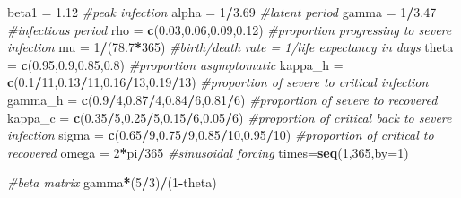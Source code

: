 \documentclass[
]{article}
\newenvironment{Shaded}{\begin{snugshade}}{\end{snugshade}}
\newcommand{\CommentTok}[1]{\textcolor[rgb]{0.56,0.35,0.01}{\textit{#1}}}
\newcommand{\DataTypeTok}[1]{\textcolor[rgb]{0.13,0.29,0.53}{#1}}
\newcommand{\DecValTok}[1]{\textcolor[rgb]{0.00,0.00,0.81}{#1}}
\newcommand{\FloatTok}[1]{\textcolor[rgb]{0.00,0.00,0.81}{#1}}
\newcommand{\KeywordTok}[1]{\textcolor[rgb]{0.13,0.29,0.53}{\textbf{#1}}}
\newcommand{\NormalTok}[1]{#1}
\newcommand{\OperatorTok}[1]{\textcolor[rgb]{0.81,0.36,0.00}{\textbf{#1}}}
\newcommand{\StringTok}[1]{\textcolor[rgb]{0.31,0.60,0.02}{#1}}
\begin{document}
\begin{Shaded}
\begin{Highlighting}[]
\NormalTok{beta1 =}\StringTok{ }\FloatTok{1.12} \CommentTok{#peak infection}
\NormalTok{alpha =}\StringTok{ }\DecValTok{1}\OperatorTok{/}\FloatTok{3.69} \CommentTok{#latent period}
\NormalTok{gamma =}\StringTok{ }\DecValTok{1}\OperatorTok{/}\FloatTok{3.47} \CommentTok{#infectious period}
\NormalTok{rho =}\StringTok{ }\KeywordTok{c}\NormalTok{(}\FloatTok{0.03}\NormalTok{,}\FloatTok{0.06}\NormalTok{,}\FloatTok{0.09}\NormalTok{,}\FloatTok{0.12}\NormalTok{) }\CommentTok{#proportion progressing to severe infection}
\NormalTok{mu =}\StringTok{ }\DecValTok{1}\OperatorTok{/}\NormalTok{(}\FloatTok{78.7}\OperatorTok{*}\DecValTok{365}\NormalTok{) }\CommentTok{#birth/death rate = 1/life expectancy in days}
\NormalTok{theta =}\StringTok{ }\KeywordTok{c}\NormalTok{(}\FloatTok{0.95}\NormalTok{,}\FloatTok{0.9}\NormalTok{,}\FloatTok{0.85}\NormalTok{,}\FloatTok{0.8}\NormalTok{) }\CommentTok{#proportion asymptomatic}
\NormalTok{kappa_h =}\StringTok{ }\KeywordTok{c}\NormalTok{(}\FloatTok{0.1}\OperatorTok{/}\DecValTok{11}\NormalTok{,}\FloatTok{0.13}\OperatorTok{/}\DecValTok{11}\NormalTok{,}\FloatTok{0.16}\OperatorTok{/}\DecValTok{13}\NormalTok{,}\FloatTok{0.19}\OperatorTok{/}\DecValTok{13}\NormalTok{) }\CommentTok{#proportion of severe to critical infection}
\NormalTok{gamma_h =}\StringTok{ }\KeywordTok{c}\NormalTok{(}\FloatTok{0.9}\OperatorTok{/}\DecValTok{4}\NormalTok{,}\FloatTok{0.87}\OperatorTok{/}\DecValTok{4}\NormalTok{,}\FloatTok{0.84}\OperatorTok{/}\DecValTok{6}\NormalTok{,}\FloatTok{0.81}\OperatorTok{/}\DecValTok{6}\NormalTok{) }\CommentTok{#proportion of severe to recovered}
\NormalTok{kappa_c =}\StringTok{ }\KeywordTok{c}\NormalTok{(}\FloatTok{0.35}\OperatorTok{/}\DecValTok{5}\NormalTok{,}\FloatTok{0.25}\OperatorTok{/}\DecValTok{5}\NormalTok{,}\FloatTok{0.15}\OperatorTok{/}\DecValTok{6}\NormalTok{,}\FloatTok{0.05}\OperatorTok{/}\DecValTok{6}\NormalTok{) }\CommentTok{#proportion of critical back to severe infection}
\NormalTok{sigma =}\StringTok{ }\KeywordTok{c}\NormalTok{(}\FloatTok{0.65}\OperatorTok{/}\DecValTok{9}\NormalTok{,}\FloatTok{0.75}\OperatorTok{/}\DecValTok{9}\NormalTok{,}\FloatTok{0.85}\OperatorTok{/}\DecValTok{10}\NormalTok{,}\FloatTok{0.95}\OperatorTok{/}\DecValTok{10}\NormalTok{) }\CommentTok{#proportion of critical  to recovered}
\NormalTok{omega =}\StringTok{ }\DecValTok{2}\OperatorTok{*}\NormalTok{pi}\OperatorTok{/}\DecValTok{365} \CommentTok{#sinusoidal forcing}
\NormalTok{times=}\KeywordTok{seq}\NormalTok{(}\DecValTok{1}\NormalTok{,}\DecValTok{365}\NormalTok{,}\DataTypeTok{by=}\DecValTok{1}\NormalTok{) }

\CommentTok{#beta matrix}
\NormalTok{gamma}\OperatorTok{*}\NormalTok{(}\DecValTok{5}\OperatorTok{/}\DecValTok{3}\NormalTok{)}\OperatorTok{/}\NormalTok{(}\DecValTok{1}\OperatorTok{-}\NormalTok{theta)}
\end{Highlighting}
\end{Shaded}
\end{document}
